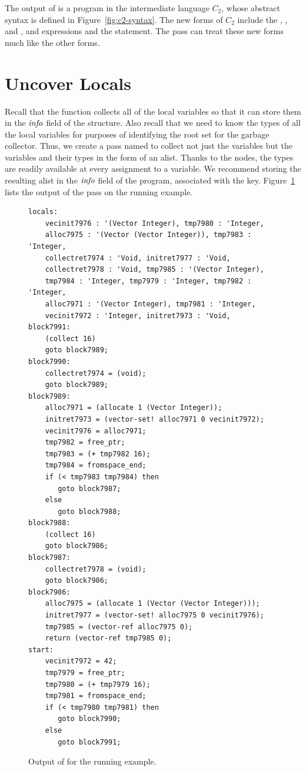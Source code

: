 \documentclass[11pt]{book}
\begin{document}
The output of  is a program in the
intermediate language $C_2$, whose abstract syntax is defined in
Figure~\ref{fig:c2-syntax}.  The new forms of $C_2$ include the
, , and , and
 expressions and the  statement.  The
 pass can treat these new forms much like the
other forms.


\section{Uncover Locals}
\label{sec:uncover-locals-r3}

Recall that the  function collects all of the
local variables so that it can store them in the $\mathit{info}$ field of
the  structure. Also recall that we need to know the
types of all the local variables for purposes of identifying the root
set for the garbage collector.  Thus, we create a pass named
 to collect not just the variables but the
variables and their types in the form of an alist. Thanks to the
 nodes, the types are readily available at every
assignment to a variable. We recommend storing the resulting alist in
the $\mathit{info}$ field of the program, associated with the
 key. Figure~\ref{fig:uncover-locals-r3} lists the output
of the  pass on the running example.

\begin{figure}[tbp]
\begin{lstlisting}
locals:
    vecinit7976 : '(Vector Integer), tmp7980 : 'Integer,
    alloc7975 : '(Vector (Vector Integer)), tmp7983 : 'Integer,
    collectret7974 : 'Void, initret7977 : 'Void,
    collectret7978 : 'Void, tmp7985 : '(Vector Integer),
    tmp7984 : 'Integer, tmp7979 : 'Integer, tmp7982 : 'Integer,
    alloc7971 : '(Vector Integer), tmp7981 : 'Integer,
    vecinit7972 : 'Integer, initret7973 : 'Void, 
block7991:
    (collect 16)
    goto block7989;
block7990:
    collectret7974 = (void);
    goto block7989;
block7989:
    alloc7971 = (allocate 1 (Vector Integer));
    initret7973 = (vector-set! alloc7971 0 vecinit7972);
    vecinit7976 = alloc7971;
    tmp7982 = free_ptr;
    tmp7983 = (+ tmp7982 16);
    tmp7984 = fromspace_end;
    if (< tmp7983 tmp7984) then
       goto block7987;
    else
       goto block7988;
block7988:
    (collect 16)
    goto block7986;
block7987:
    collectret7978 = (void);
    goto block7986;
block7986:
    alloc7975 = (allocate 1 (Vector (Vector Integer)));
    initret7977 = (vector-set! alloc7975 0 vecinit7976);
    tmp7985 = (vector-ref alloc7975 0);
    return (vector-ref tmp7985 0);
start:
    vecinit7972 = 42;
    tmp7979 = free_ptr;
    tmp7980 = (+ tmp7979 16);
    tmp7981 = fromspace_end;
    if (< tmp7980 tmp7981) then
       goto block7990;
    else
       goto block7991;
\end{lstlisting}
\caption{Output of  for the running example.}
\label{fig:uncover-locals-r3}
\end{figure}
\end{document}

